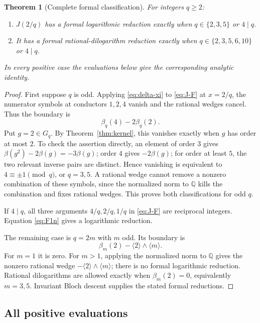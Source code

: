 \documentclass[11pt]{article}
\numberwithin{equation}{section}
\newtheorem{theorem}{Theorem}[section]
\theoremstyle{definition}
\theoremstyle{remark}
\newcommand{\Q}{\mathbb Q}
\newcommand{\cl}[1]{\langle #1\rangle}
\begin{document}
\begin{theorem}[Complete formal classification]\label{thm:J-class}
For integers $q\ge2$:
\begin{enumerate}
\item $J(2/q)$ has a formal logarithmic reduction exactly when
      $q\in\{2,3,5\}$ or $4\mid q$.
\item It has a formal rational-dilogarithm reduction exactly when
      $q\in\{2,3,5,6,10\}$ or $4\mid q$.
\end{enumerate}
In every positive case the evaluations below give the corresponding
analytic identity.
\end{theorem}
\begin{proof}
First suppose $q$ is odd. Applying \eqref{eq:delta-xi} to
\eqref{eq:J-F} at $x=2/q$, the numerator symbols at conductors
$1,2,4$ vanish and the rational wedges cancel. Thus the boundary is
\[
 \beta_q(4)-2\beta_q(2).
\]
Put $g=2\in G_q$. By Theorem~\ref{thm:kernel}, this vanishes exactly
when $g$ has order at most $2$. To check the assertion directly, an
element of order $3$ gives $\beta(g^2)-2\beta(g)=-3\beta(g)$; order
$4$ gives $-2\beta(g)$; for order at least $5$, the two relevant
inverse pairs are distinct. Hence vanishing is equivalent to
$4\equiv\pm1\pmod q$, or $q=3,5$. A rational wedge cannot remove a
nonzero combination of these symbols, since the normalized norm to
$\Q$ kills the combination and fixes rational wedges. This proves
both classifications for odd $q$.

If $4\mid q$, all three arguments $4/q,2/q,1/q$ in
\eqref{eq:J-F} are reciprocal integers. Equation \eqref{eq:F1n}
gives a logarithmic reduction.

The remaining case is $q=2m$ with $m$ odd. Its boundary is
\begin{equation}\label{eq:J-even-boundary}
 \beta_m(2)-\cl2\wedge\cl m.
\end{equation}
For $m=1$ it is zero. For $m>1$, applying the normalized norm to
$\Q$ gives the nonzero rational wedge $-\cl2\wedge\cl m$;
there is no formal logarithmic reduction. Rational dilogarithms are
allowed exactly when $\beta_m(2)=0$, equivalently $m=3,5$.
Invariant Bloch descent supplies the stated formal reductions.
\end{proof}

\subsection{All positive evaluations}
\end{document}
